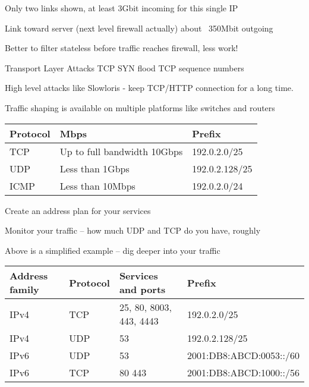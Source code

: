 \documentclass[Screen16to9,17pt]{foils}
\begin{document}

\centerline{Only two links shown, at least 3Gbit incoming for this single IP}

\centerline{Link toward server (next level firewall actually) about ~350Mbit outgoing}

Better to filter stateless before traffic reaches firewall, less work!





\begin{list2}
\item Transport Layer Attacks TCP SYN flood TCP sequence numbers
\item High level attacks like Slowloris - keep TCP/HTTP connection for a long time.
\item Traffic shaping is available on multiple platforms like switches and routers
\end{list2}



\begin{tabularx}{\textwidth-5cm}{|p{5cm}|p{7cm}|X|} \hline
{\bf Protocol} & {\bf Mbps} & {\bf Prefix}\\\hline
TCP & Up to full bandwidth 10Gbps & 192.0.2.0/25 \\\hline
UDP & Less than 1Gbps & 192.0.2.128/25 \\\hline
ICMP & Less than 10Mbps & 192.0.2.0/24 \\\hline
\end{tabularx}


\begin{list2}
\item Create an address plan for your services
\item Monitor your traffic -- how much UDP and TCP do you have, roughly

\item Above is a simplified example -- dig deeper into your traffic
\end{list2}


\begin{tabularx}{\textwidth-5cm}{|p{2cm}|p{2cm}|p{7cm}|X|} \hline
{\bf Address family} & {\bf Protocol} & {\bf Services and ports} & {\bf Prefix}\\\hline
IPv4 & TCP & 25, 80, 8003, 443, 4443 & 192.0.2.0/25 \\\hline
IPv4 & UDP & 53 & 192.0.2.128/25 \\\hline
IPv6 & UDP & 53  & 2001:DB8:ABCD:0053::/60 \\\hline
IPv6 & TCP & 80 443 & 2001:DB8:ABCD:1000::/56 \\\hline
\end{tabularx}
\end{document}
